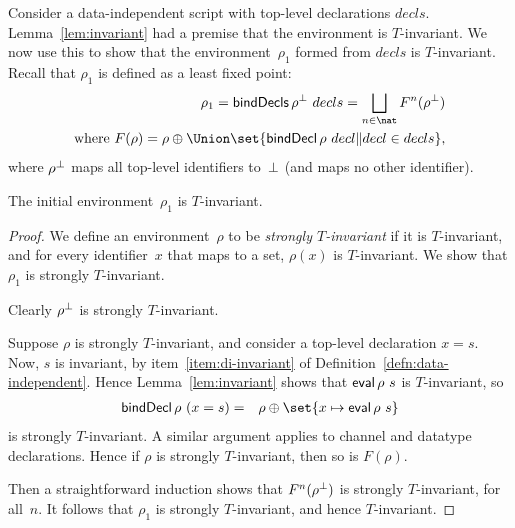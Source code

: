 

Consider a data-independent script with top-level declarations $decls$.
Lemma~\ref{lem:invariant} had a premise that the environment is 
$T$-invariant.  We now use this to show that the environment~$\rho_1$ formed
from $decls$ is $T$-invariant.  Recall that $\rho_1$ is defined as a
least fixed point:
\[
\begin{align}
\rho_1 =  \bindDecls \rho^\bottom~decls = \bigsqcup_{n \in \nat} F^n(\rho^\bottom) \\
\mbox{where } F(\rho)  =  
    \rho \oplus \Union \set{\bindDecl \rho ~ decl \| decl \in decls},
\end{align}
\]
where $\rho^\perp$ maps all top-level identifiers to~$\perp$ (and maps no
other identifier).




\begin{prop}
\label{prop:initial-env-invariant}
The initial environment~$\rho_1$ is  $T$-invariant.
\end{prop}

\begin{proof}
We define an environment~$\rho$ to be \emph{strongly $T$-invariant} if it is
$T$-invariant, and for every identifier~$x$ that maps to a set, $\rho(x)$ is
$T$-invariant.  We show that $\rho_1$ is strongly $T$-invariant. 

Clearly $\rho^\perp$ is strongly  $T$-invariant.  

Suppose $\rho$ is strongly $T$-invariant, and consider a top-level declaration
$x = s$.  Now, $s$ is invariant, by item~\ref{item:di-invariant} of
Definition~\ref{defn:data-independent}.  Hence Lemma~\ref{lem:invariant} shows
that $\mathop{\sf eval} \rho~s$ is $T$-invariant, so
\begin{eqnarray*}
\bindDecl \rho~(x = s) & = & \rho \oplus \set{x \mapsto \eval \rho~s}
\end{eqnarray*}
is strongly $T$-invariant.  A similar argument applies to channel and datatype
declarations.  Hence if $\rho$ is strongly $T$-invariant, then so is $F(\rho)$.

Then a straightforward induction shows that $F^n(\rho^\perp)$ is strongly
$T$-invariant, for all~$n$.  It follows that $\rho_1$ is strongly
$T$-invariant, and hence $T$-invariant.
\end{proof}

